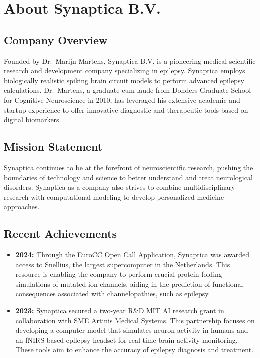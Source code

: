 \section*{About Synaptica B.V.}
\subsection*{Company Overview}
Founded by Dr.\ Marijn Martens, Synaptica B.V. is a pioneering medical-scientific research and development company specializing in epilepsy.
Synaptica employs biologically realistic spiking brain circuit models to perform advanced epilepsy calculations.
Dr.\ Martens, a graduate cum laude from Donders Graduate School for Cognitive Neuroscience in 2010, has leveraged his
extensive academic and startup experience to offer innovative diagnostic and therapeutic tools based on digital biomarkers.

\subsection*{Mission Statement}
Synaptica continues to be at the forefront of neuroscientific research,
pushing the boundaries of technology and science to better understand and treat neurological disorders.
Synaptica as a company also strives to combine multidisciplinary research with computational modeling to develop personalized medicine approaches.

\subsection*{Recent Achievements}
\begin{itemize}
    \item \textbf{2024:} Through the EuroCC Open Call Application, Synaptica was awarded access to Snellius,
          the largest supercomputer in the Netherlands. This resource is enabling the company to perform crucial protein
          folding simulations of mutated ion channels, aiding in the prediction of functional consequences associated with channelopathies, such as epilepsy.

    \item \textbf{2023:} Synaptica secured a two-year R\&D MIT AI research grant in collaboration with SME Artinis Medical Systems.
          This partnership focuses on developing a computer model that simulates neuron activity in humans and an fNIRS-based epilepsy headset
          for real-time brain activity monitoring. These tools aim to enhance the accuracy of epilepsy diagnosis and treatment.
\end{itemize}

